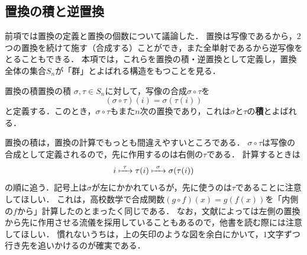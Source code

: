 \subsection{置換の積と逆置換}

前項では置換の定義と置換の個数について議論した．
置換は写像であるから，$2$つの置換を続けて施す（合成する）ことができ，また全単射であるから逆写像をとることもできる．
本項では，これらを置換の積・逆置換として定義し，置換全体の集合$S_n$が「群」とよばれる構造をもつことを見る．

\begin{definition}{置換の積}{置換の積}
  $\sigma, \tau \in S_n$に対して，写像の合成$\sigma \circ \tau$を
  \[
  (\sigma \circ \tau)(i) = \sigma(\tau(i))
  \]
  と定義する．このとき，$\sigma \circ \tau$もまた$n$次の置換であり，これは$\sigma$と$\tau$の\textbf{積}とよばれる．
\end{definition}

置換の積は，置換の計算でもっとも間違えやすいところである．
$\sigma \circ \tau$は写像の合成として定義されるので，先に作用するのは右側の$\tau$である．
計算するときは
\[
i \xmapsto{\ \tau\ } \tau(i) \xmapsto{\ \sigma\ } \sigma(\tau(i))
\]
の順に追う．記号上は$\sigma$が左にかかれているが，先に使うのは$\tau$であることに注意してほしい．
これは，高校数学で合成関数$(g \circ f)(x) = g(f(x))$を「内側の$f$から」計算したのとまったく同じである．
なお，文献によっては左側の置換から先に作用させる流儀を採用していることもあるので，他書を読む際には注意してほしい．
慣れないうちは，上の矢印のような図を余白にかいて，$1$文字ずつ行き先を追いかけるのが確実である．

